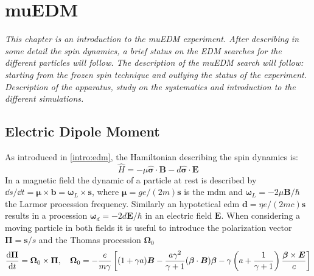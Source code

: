 \chapter{muEDM}
\begin{refsection}

{\itshape
This chapter is an introduction to the muEDM experiment. After describing in some detail the spin dynamics, a brief status on the EDM searches for the different particles will follow.
The description of the muEDM search will follow: starting from the frozen spin technique and outlying the status of the experiment. 
Description of the apparatus, study on the systematics and introduction to the different simulations.}

\section{Electric Dipole Moment}
As introduced in \ref{intro:edm}, the Hamiltonian describing the spin dynamics is:
        \begin{equation}
            \hat{H} = -\mu\bm{\hat{\sigma}\cdot B}-d\bm{\hat{\sigma}\cdot E}
        \end{equation}
        In a magnetic field the dynamic of a particle at rest is described by $\dd s/\dd t=\bm{\mu}\times\bm{b} = \bm{\omega}_L\times\bm{s}$, where $\bm{\mu}=ge/(2m)\bm{s}$ is the \gls{mdm} and $\bm{\omega}_L=-2\mu\bm{B}/\hbar$ the Larmor procession frequency.
        Similarly an hypotetical \gls{edm} $\bm{d}=\eta e/(2mc)\bm{s}$ results in a procession $\bm{\omega}_d=-2d\bm{E}/\hbar$ in an electric field $\bm{E}$.
        When considering a moving particle in both fields it is useful to introduce the polarization vector $\bm{\Pi}=\bm{s}/s$ and the Thomas procession $\bm{\Omega}_0$
        \begin{equation}
            \dv{\bm{\Pi}}{t}=\bm{\Omega}_0 \times \bm{\Pi}, \quad
            \bm{\Omega}_0 = -\frac{e}{m\gamma} \left[ (1+\gamma a)\bm{B}-\frac{a\gamma^2}{\gamma+1}(\bm{\beta}\cdot\bm{B})\bm{\beta}-\gamma \left( a+\frac{1}{\gamma+1} \right) \frac{\bm{\beta}\times \bm{E}}{c} \right]
        \end{equation}
        
        \cite{muEDM:Flavour:2008}\cite{muEDM:Ring:2004}
        

\end{refsection}
